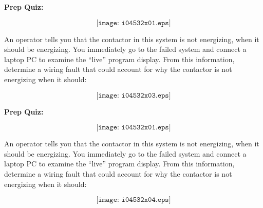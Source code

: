 \noindent
{\bf Prep Quiz:}

$$\texttt{[image: i04532x01.eps]}$$

An operator tells you that the contactor in this system is not energizing, when it should be energizing.  You immediately go to the failed system and connect a laptop PC to examine the ``live'' program display.  From this information, determine a wiring fault that could account for why the contactor is not energizing when it should:

$$\texttt{[image: i04532x03.eps]}$$












\vfil \eject

\noindent
{\bf Prep Quiz:}

$$\texttt{[image: i04532x01.eps]}$$

An operator tells you that the contactor in this system is not energizing, when it should be energizing.  You immediately go to the failed system and connect a laptop PC to examine the ``live'' program display.  From this information, determine a wiring fault that could account for why the contactor is not energizing when it should:

$$\texttt{[image: i04532x04.eps]}$$




